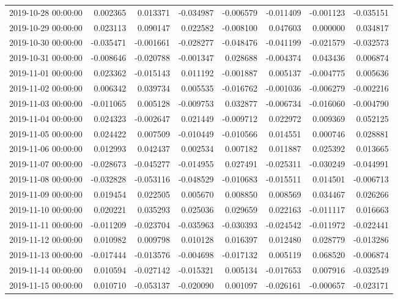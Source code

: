 \begin{tabular}{lrrrrrrr}
2019-10-28 00:00:00 & 0.002365 & 0.013371 & -0.034987 & -0.006579 & -0.011409 & -0.001123 & -0.035151 \\
2019-10-29 00:00:00 & 0.023113 & 0.090147 & 0.022582 & -0.008100 & 0.047603 & 0.000000 & 0.034817 \\
2019-10-30 00:00:00 & -0.035471 & -0.001661 & -0.028277 & -0.048476 & -0.041199 & -0.021579 & -0.032573 \\
2019-10-31 00:00:00 & -0.008646 & -0.020788 & -0.001347 & 0.028688 & -0.004374 & 0.043436 & 0.006874 \\
2019-11-01 00:00:00 & 0.023362 & -0.015143 & 0.011192 & -0.001887 & 0.005137 & -0.004775 & 0.005636 \\
2019-11-02 00:00:00 & 0.006342 & 0.039734 & 0.005535 & -0.016762 & -0.001036 & -0.006279 & -0.002216 \\
2019-11-03 00:00:00 & -0.011065 & 0.005128 & -0.009753 & 0.032877 & -0.006734 & -0.016060 & -0.004790 \\
2019-11-04 00:00:00 & 0.024323 & -0.002647 & 0.021449 & -0.009712 & 0.022972 & 0.009369 & 0.052125 \\
2019-11-05 00:00:00 & 0.024422 & 0.007509 & -0.010449 & -0.010566 & 0.014551 & 0.000746 & 0.028881 \\
2019-11-06 00:00:00 & 0.012993 & 0.042437 & 0.002534 & 0.007182 & 0.011887 & 0.025392 & 0.013665 \\
2019-11-07 00:00:00 & -0.028673 & -0.045277 & -0.014955 & 0.027491 & -0.025311 & -0.030249 & -0.044991 \\
2019-11-08 00:00:00 & -0.032828 & -0.053116 & -0.048529 & -0.010683 & -0.015511 & 0.014501 & -0.006713 \\
2019-11-09 00:00:00 & 0.019454 & 0.022505 & 0.005670 & 0.008850 & 0.008569 & 0.034467 & 0.026266 \\
2019-11-10 00:00:00 & 0.020221 & 0.035293 & 0.025036 & 0.029659 & 0.022163 & -0.011117 & 0.016663 \\
2019-11-11 00:00:00 & -0.011209 & -0.023704 & -0.035963 & -0.030393 & -0.024542 & -0.011972 & -0.022441 \\
2019-11-12 00:00:00 & 0.010982 & 0.009798 & 0.010128 & 0.016397 & 0.012480 & 0.028779 & -0.013286 \\
2019-11-13 00:00:00 & -0.017444 & -0.013576 & -0.004698 & -0.017132 & 0.005119 & 0.068520 & -0.006874 \\
2019-11-14 00:00:00 & 0.010594 & -0.027142 & -0.015321 & 0.005134 & -0.017653 & 0.007916 & -0.032549 \\
2019-11-15 00:00:00 & 0.010710 & -0.053137 & -0.020090 & 0.001097 & -0.026161 & -0.000657 & -0.023171 \\

\end{tabular}
